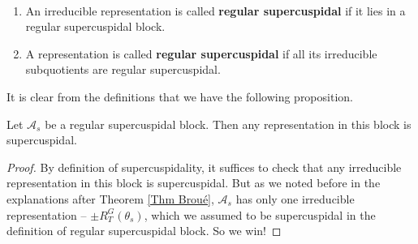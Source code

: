 		\begin{definition}\label{Def regular supercuspidal}\
			
			\begin{enumerate}
				\item An irreducible representation is called \textbf{regular supercuspidal} if it lies in a regular supercuspidal block.
				\item A representation is called \textbf{regular supercuspidal} if all its irreducible subquotients are regular supercuspidal.
			\end{enumerate}
		\end{definition}
		
        It is clear from the definitions that we have the following proposition.
		
		\begin{proposition}\label{Theorem Pure SC}
			Let $\mathcal{A}_s$ be a regular supercuspidal block. Then any representation in this block is supercuspidal.
		\end{proposition}
		
		\begin{proof}
			By definition of supercuspidality, it suffices to check that any irreducible representation in this block is supercuspidal. But as we noted before in the explanations after Theorem \ref{Thm Broué}, $\mathcal{A}_s$ has only one irreducible representation -- $\pm R_T^G(\theta_s)$, which we assumed to be supercuspidal in the definition of regular supercuspidal block. So we win!
		\end{proof}
		
		
		
		
		

